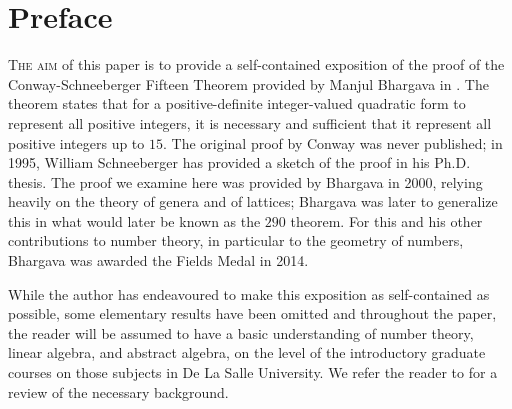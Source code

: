 \chapter*{Preface}

{\scshape The aim} of this paper is to provide a self-contained exposition of the proof of the Conway-Schneeberger Fifteen Theorem provided by Manjul Bhargava in \cite{bhargava2000conway}. The theorem states that for a positive-definite integer-valued quadratic form to represent all positive integers, it is necessary and sufficient that it represent all positive integers up to \(15\). The original proof by Conway was never published; in 1995, William Schneeberger has provided a sketch of the proof in his Ph.D. thesis. \cite{schneeberger1997arithmetic} The proof we examine here was provided by Bhargava in 2000, relying heavily on the theory of genera and of lattices; Bhargava was later to generalize this in what would later be known as the \(290\) theorem. \cite{bhargava2005universal} For this and his other contributions to number theory, in particular to the geometry of numbers, Bhargava was awarded the Fields Medal in 2014. \cite{bhargava2014fields}

While the author has endeavoured to make this exposition as self-contained as possible, some elementary results have been omitted and throughout the paper, the reader will be assumed to have a basic understanding of number theory, linear algebra, and abstract algebra, on the level of the introductory graduate courses on those subjects in De La Salle University. We refer the reader to \cite{dudley1978elementary,halmos1942vector,hungerford2012algebra} for a review of the necessary background.

